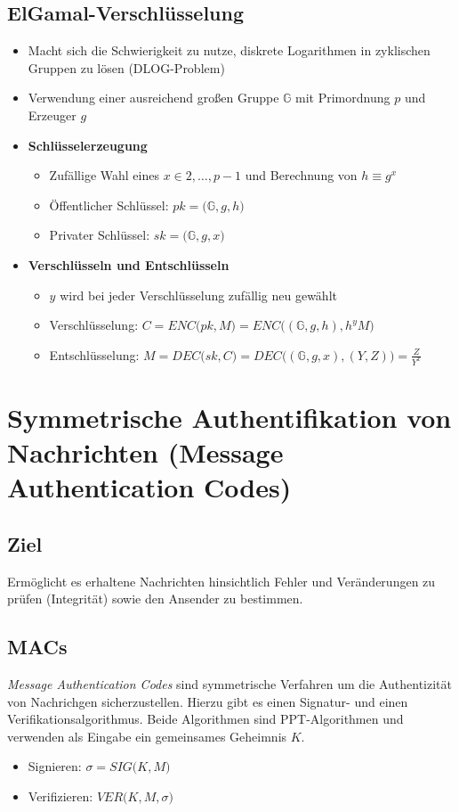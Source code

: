 \subsection{ElGamal-Verschlüsselung}
\begin{itemize}
	\item Macht sich die Schwierigkeit zu nutze, diskrete Logarithmen in zyklischen Gruppen zu lösen (DLOG-Problem)
	\item Verwendung einer ausreichend großen Gruppe \(\mathbb{G}\) mit Primordnung \(p\) und Erzeuger \(g\)
	\item \textbf{Schlüsselerzeugung}
	\begin{itemize}
		\item Zufällige Wahl eines \(x \in 2,\ldots,p-1\) und Berechnung von \(h \equiv g^x\)
		\item Öffentlicher Schlüssel: \(pk = \big(\mathbb{G},g,h\big)\)
		\item Privater Schlüssel: \(sk = \big(\mathbb{G},g,x\big)\)
	\end{itemize}
	\item \textbf{Verschlüsseln und Entschlüsseln}
	\begin{itemize}
		\item \(y\) wird bei jeder Verschlüsselung zufällig neu gewählt
		\item Verschlüsselung: \(C = ENC\big(pk,M\big) = ENC\big((\mathbb{G},g,h), h^yM\big)\)
		\item Entschlüsselung: \(M = DEC\big(sk,C\big) = DEC\big((\mathbb{G},g,x),(Y,Z)\big) = \frac{Z}{Y^x}\)
	\end{itemize}
\end{itemize}


\section{Symmetrische Authentifikation von Nachrichten (Message Authentication Codes)}

\subsection{Ziel}
Ermöglicht es erhaltene Nachrichten hinsichtlich Fehler und Veränderungen zu prüfen (Integrität) sowie den Ansender zu bestimmen.

\subsection{MACs}
\textit{Message Authentication Codes} sind symmetrische Verfahren um die Authentizität von Nachrichgen sicherzustellen. Hierzu gibt es einen Signatur- und einen Verifikationsalgorithmus. Beide Algorithmen sind PPT-Algorithmen und verwenden als Eingabe ein gemeinsames Geheimnis \(K\).
\begin{itemize}
	\item Signieren: \(\sigma = SIG\big(K,M\big)\)
	\item Verifizieren: \(VER\big(K,M,\sigma\big)\)
\end{itemize}


